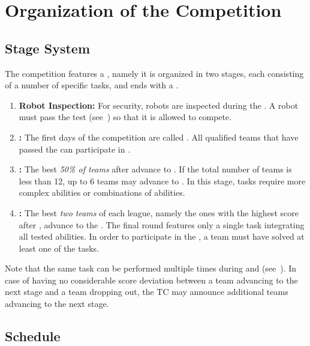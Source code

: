 \section{Organization of the Competition}
\label{sec:procedure_during_competition}

\subsection{Stage System}\label{rule:stages}

The competition features a , namely it is organized in two stages, each consisting of a number of specific tasks, and ends with a \FINAL.
\begin{enumerate}
	\item \textbf{Robot Inspection:} For security, robots are inspected during the \SetupDays.
	A robot must pass the \RobotInspection{} test (see~) so that it is allowed to compete.
	
	\item \textbf{\SONE:} The first days of the competition are called \SONE.
	All qualified teams that have passed the \RobotInspection{} can participate in \SONE.
	
	
	\item \textbf{\STWO:} The best \emph{50\% of teams} after \SONE{} advance to \STWO. If the total number of teams is less than 12, up to 6 teams may advance to \STWO.
	In this stage, tasks require more complex abilities or combinations of abilities.
	
	\item \textbf{\FINAL:} The best \emph{two teams} of each league, namely the ones with the highest score after \STWO, advance to the \FINAL.
	The final round features only a single task integrating all tested abilities.
	In order to participate in the \FINAL, a team must have solved at least one of the \STWO{} tasks.
\end{enumerate}
Note that the same task can be performed multiple times during \SONE{} and \STWO{} (see~).
In case of having no considerable score deviation between a team advancing to the next stage and a team dropping out, the TC may announce additional teams advancing to the next stage.


\subsection{Schedule}
\label{rule:schedule}

